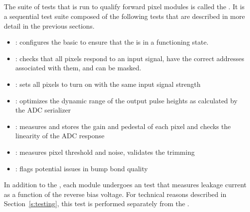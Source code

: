 
\newpage

\subsection{\fulltest}
\label{ss:fulltest}

The suite of tests that is run to qualify forward pixel modules is called the
\fulltest. It is a sequential test suite composed of the following tests
that are described in more detail in the previous sections.
\begin{itemize}
  \item \pretest: configures the basic \dacs to ensure that the \roc is in a functioning state.
  \item \alivetest: checks that all pixels respond to an input signal,
  have the correct addresses associated with them, and can be masked. 
  \item \trimming: sets all pixels to turn on with the same input signal strength
  \item \phopt: optimizes the dynamic range of the output pulse heights as calculated by the ADC serializer
  \item \gainped: measures and stores the gain and pedestal of each pixel and checks the linearity of the ADC response
  \item \scurves: measures pixel threshold and noise, validates the trimming
  \item \bb: flags potential issues in bump bond quality
\end{itemize}
In addition to the \fulltest, each module undergoes an \iv test that measures leakage current as a function of the reverse bias voltage.
For technical reasons described in Section~\ref{s:testing}, this test is performed separately from the \fulltest.
